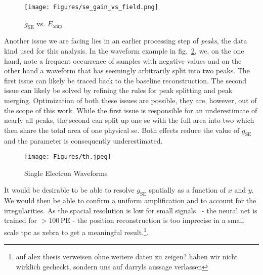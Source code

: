 \begin{figure}
    \centering
    \texttt{[image: Figures/se\_gain\_vs\_field.png]}  %
    \caption[\oneton~comparison of Amplification Gain vs. Fieldstrength]{
        $ g_\mathrm{SE} $ vs. $ E_\mathrm{amp} $
    }
    \label{fig:seg-vs-field}
\end{figure}


Another issue we are facing lies in an earlier processing step of \emph{peaks}, the data kind used for this analysis.
In the waveform example in fig.~\ref{fig:waveforms-se}, we, on the one hand, note a frequent occurrence of samples with negative values and on the other hand a waveform that has seemingly arbitrarily split into two peaks.
The first issue can likely be traced back to the baseline reconstruction.
The second issue can likely be solved by refining the rules for peak splitting and peak merging.
Optimization of both these issues are possible, they are, however, out of the scope of this work.
While the first issue is responsible for an underestimate of nearly all peaks, the second can split up one \gls{se} with the full area into two which then share the total area of one physical \gls{se}.
Both effects reduce the value of $ g_\mathrm{SE} $ and the parameter is consequently underestimated.


\begin{figure}
    \centering
    \texttt{[image: Figures/th.jpeg]}  %
    \caption[Single Electrons Waveforms]{
        Single Electron Waveforms
    }
    \label{fig:waveforms-se}
\end{figure}




It would be desirable to be able to resolve $ g_\mathrm{SE} $ spatially as a function of $ x $ and $ y $.
We would then be able to confirm a uniform amplification and to account for the irregularities.
As the spacial resolution is low for small signals~\cite{ABism} - the neural net is trained for $ > 100\,\mathrm{PE} $ - the position reconstruction is too imprecise in a small scale \gls{tpc} as \gls{xebra} to get a meaningful result.\footnote{auf alex thesis verweisen ohne weitere daten zu zeigen? haben wir nicht wirklich gecheckt, sondern uns auf darryls aussage verlassen}.



